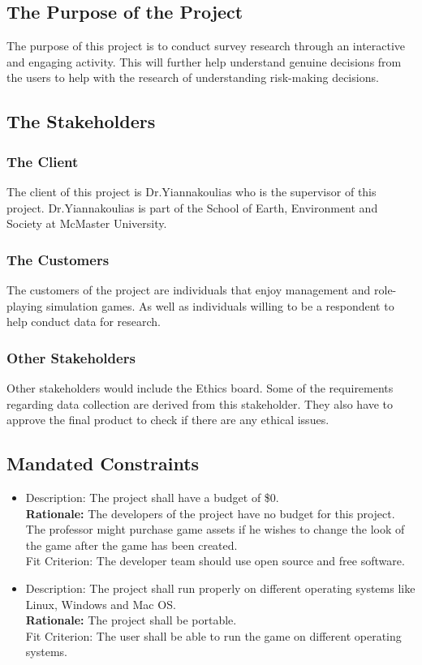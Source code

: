 \documentclass{article}
\begin{document}
\subsection{The Purpose of the Project}
The purpose of this project is to conduct survey research through an interactive and engaging activity. This will further help understand genuine decisions from the users to help with the research of understanding risk-making decisions.


\subsection{The Stakeholders}

\subsubsection{The Client}
The client of this project is Dr.Yiannakoulias who is the supervisor of this project. Dr.Yiannakoulias is part of the School of Earth, Environment and Society at McMaster University.

\subsubsection{The Customers}
The customers of the project are individuals that enjoy management and role-playing simulation games. As well as individuals willing to be a respondent to help conduct data for research.

\subsubsection{Other Stakeholders}
Other stakeholders would include the Ethics board. Some of the requirements regarding data collection are derived from this stakeholder. They also have to approve the final product to check if there are any ethical issues.

\subsection{Mandated Constraints}

\begin{itemize}
    \item Description: The project shall have a budget of \$0.\\
    \textbf{Rationale:} The developers of the project have no budget for this project. The professor might purchase game assets if he wishes to change the look of the game after the game has been created.\\ 
    Fit Criterion: The developer team should use open source and free software.
    \item Description: The project shall run properly on different operating systems like Linux, Windows and Mac OS.\\
    \textbf{Rationale:} The project shall be portable.\\
    Fit Criterion: The user shall be able to run the game on different operating systems.
\end{itemize}
\end{document}
